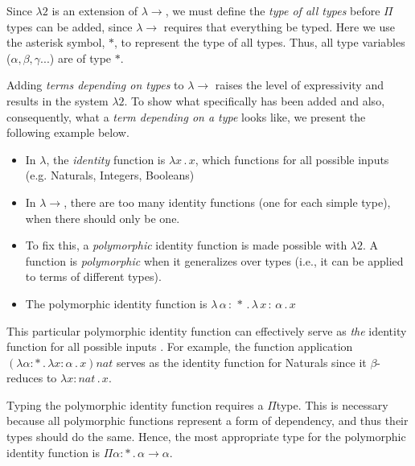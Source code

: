 \documentclass[9pt,preprint,nocopyrightspace,computermodern]{sigplanconf} %
\begin{document}
Since \(\lambda2\) is an extension of \(\lambda\!\!\rightarrow\), we must
define the \textit{type of all types} before \(\Pi\)types can be added, since
\(\lambda\!\!\rightarrow\) requires that everything be typed. Here we use the asterisk symbol,
\(*\), to represent the type of all types. Thus, all type variables
(\(\alpha,\beta,\gamma ...\)) are of type \(*\).

Adding \textit{terms depending on types} to \(\lambda\!\!\rightarrow\) raises the level
of expressivity and results in the system \(\lambda 2\). To show what specifically
has been added and also, consequently, what a \textit{term depending on a type} looks like,
we present the following example below.
\begin{itemize}
\item In \(\lambda\), the \textit{identity} function is \(\lambda x\,.\,x\), which functions
  for all possible inputs (e.g. Naturals, Integers, Booleans)
\item In \(\lambda\!\!\rightarrow\), there are too many identity functions
  (one for each simple type), when there should only be one.
\item To fix this, a \textit{polymorphic} identity function is made possible with
  \(\lambda2\). A function is \textit{polymorphic} when it generalizes over types
  (i.e., it can be applied to terms of different types). 
\item The polymorphic identity function is \(\lambda\,\alpha\,:\,*\,.\,\lambda\,x\,:\,\alpha\,.\,x\)
\end{itemize}
This particular polymorphic identity function can effectively serve as \textit{the}
identity function for all possible inputs \cite{gir}. For example, the function application
\((\lambda\alpha:*\,.\,\lambda x:\alpha\,.\,x) nat\) serves as the identity function
for Naturals since it \(\beta\)-reduces to \(\lambda x:nat\,.\,x\).

Typing the polymorphic identity function requires a \(\Pi\)type. This is necessary
because all polymorphic functions represent a form of dependency, and thus their
types should do the same. Hence, the most appropriate type for the polymorphic identity
function is \(\Pi\alpha:*\,.\,\alpha\rightarrow\alpha\).
\end{document}
